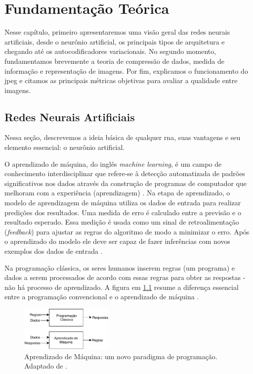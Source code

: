 \chapter{Fundamentação Teórica}
Nesse capítulo, primeiro apresentaremos uma visão geral das redes neurais artificiais, desde o neurônio artificial, os principais tipos de arquitetura e chegando até os autocodificadores variacionais.
No segundo momento, fundamentamos brevemente a teoria de compressão de dados, medida de informação e representação de imagens. Por fim, explicamos o funcionamento do \acrshort{jpeg}  e citamos as principais métricas objetivas para avaliar a qualidade entre imagens.    

\section{Redes Neurais Artificiais}
Nessa seção, descrevemos a ideia básica de qualquer \gls{rna}, suas vantagens e seu elemento essencial: o neurônio artificial. 


O aprendizado de máquina, do inglês \textit{machine learning}, é um campo de conhecimento interdisciplinar que refere-se à detecção automatizada de padrões significativos nos dados através da construção de programas de computador que melhoram com a experiência (aprendizagem) \cite{shalev2014understanding}. 
Na etapa de aprendizado, o modelo de aprendizagem de máquina  utiliza os dados de entrada para realizar predições dos resultados. Uma medida de erro é calculado entre a previsão e o resultado esperado. Essa medição é usada como um sinal de retroalimentação (\textit{feedback}) para ajustar as regras  do algoritmo de modo a minimizar o erro. Após o aprendizado do modelo ele deve ser capaz de fazer inferências com novos exemplos dos dados de entrada \cite{FrancoisDeepLearning}.

Na programação clássica, os seres humanos inserem regras (um programa) e dados a serem processados de acordo com essas regras para obter as respostas  -  não há processo de aprendizado. A figura em \ref{fig:machinelearning} resume a diferença essencial entre a programação convencional e o aprendizado de máquina \cite{FrancoisDeepLearning}.  


\begin{figure}[h]
	\centering
	\includegraphics[width=0.4\textwidth]{figuras/MachineLearning.pdf}
	\caption[Paradigmas de programação]{Aprendizado de Máquina: um novo paradigma de programação. Adaptado de \cite{FrancoisDeepLearning}.}
	\label{fig:machinelearning}
\end{figure}


